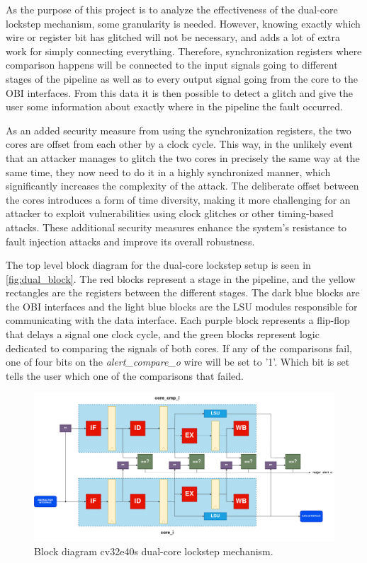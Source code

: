 As the purpose of this project is to analyze the effectiveness of the dual-core lockstep mechanism, some granularity is needed. However, knowing exactly which wire or register bit has glitched will not be necessary, and adds a lot of extra work for simply connecting everything. Therefore, synchronization registers where comparison happens will be connected to the input signals going to different stages of the pipeline as well as to every output signal going from the core to the OBI interfaces. From this data it is then possible to detect a glitch and give the user some information about exactly where in the pipeline the fault occurred. 

As an added security measure from using the synchronization registers, the two cores are offset from each other by a clock cycle. This way, in the unlikely event that an attacker manages to glitch the two cores in precisely the same way at the same time, they now need to do it in a highly synchronized manner, which significantly increases the complexity of the attack. The deliberate offset between the cores introduces a form of time diversity, making it more challenging for an attacker to exploit vulnerabilities using clock glitches or other timing-based attacks. These additional security measures enhance the system's resistance to fault injection attacks and improve its overall robustness.

The top level block diagram for the dual-core lockstep setup is seen in \autoref{fig:dual_block}. The red blocks represent a stage in the pipeline, and the yellow rectangles are the registers between the different stages. The dark blue blocks are the OBI interfaces and the light blue blocks are the LSU modules responsible for communicating with the data interface. Each purple block represents a flip-flop that delays a signal one clock cycle, and the green blocks represent logic dedicated to comparing the signals of both cores. If any of the comparisons fail, one of four bits on the \textit{alert\_compare\_o} wire will be set to '1'. Which bit is set tells the user which one of the comparisons that failed.  

\begin{figure}[ht!]
    \centering
    \includegraphics[width=\textwidth]{docs/images/dual_cores-block.png}
    \caption{Block diagram cv32e40s dual-core lockstep mechanism.}
    \label{fig:dual_block}
\end{figure}
